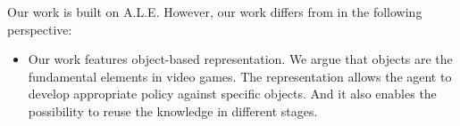 Our work is built on A.L.E. However, our work differs from \cite{Yavar} in the following perspective:

\begin{itemize}{}
\item Our work features object-based representation. We argue that objects are the fundamental elements
in video games. The representation allows the agent to develop appropriate policy against specific 
objects. And it also enables the possibility to reuse the knowledge in different stages.
\end{itemize}

